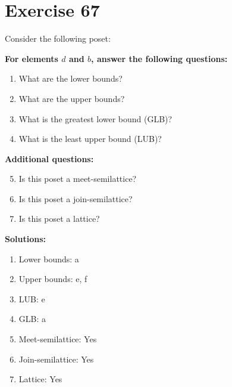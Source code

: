 \documentclass{article}
\begin{document}
\section*{Exercise 67}
Consider the following poset:
\begin{center}
\end{center}

    \textbf{For elements $d$ and $b$, answer the following questions:}
\begin{enumerate}
    \item What are the lower bounds?
    \item What are the upper bounds?
    \item What is the greatest lower bound (GLB)?
    \item What is the least upper bound (LUB)?
\end{enumerate}
    \hspace*{3ex} \textbf{Additional questions:}
\begin{enumerate}
    \setcounter{enumi}{4}
    \item Is this poset a meet-semilattice?
    \item Is this poset a join-semilattice?
    \item Is this poset a lattice?
\end{enumerate}

\textbf{Solutions:}
\begin{enumerate}
    \item Lower bounds: {a}
    \item Upper bounds: {e, f}
    \item LUB: e
    \item GLB: a
    \item Meet-semilattice: Yes
    \item Join-semilattice: Yes
    \item Lattice: Yes
\end{enumerate}
\newpage
\end{document}
